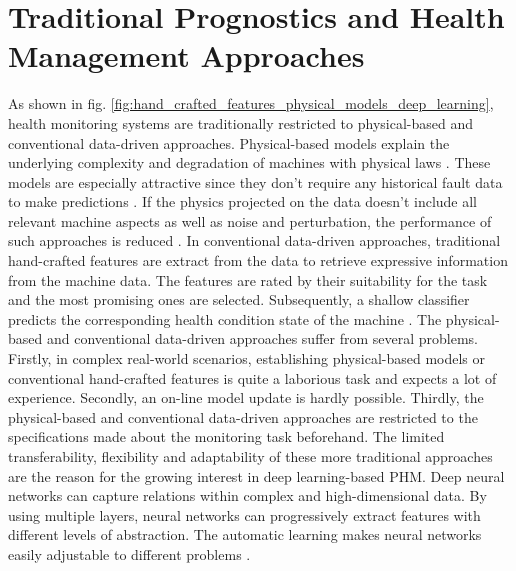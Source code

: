 \section{Traditional Prognostics and Health Management Approaches}
As shown in fig. \ref{fig:hand_crafted_features_physical_models_deep_learning}, health monitoring systems are traditionally restricted to physical-based and conventional data-driven approaches. Physical-based models explain the underlying complexity and degradation of machines with physical laws \cite{ZHAO2019213}. These models are especially attractive since they don't require any historical fault data to make predictions \cite{AN201942}. If the physics projected on the data doesn't include all relevant machine aspects as well as noise and perturbation, the performance of such approaches is reduced \cite{ZHAO2019213}. In conventional data-driven approaches, traditional hand-crafted features are extract from the data to retrieve expressive information from the machine data. The features are rated by their suitability for the task and the most promising ones are selected. Subsequently, a shallow classifier predicts the corresponding health condition state of the machine \cite{ZHAO2019213}. The physical-based and conventional data-driven approaches suffer from several problems. Firstly, in complex real-world scenarios, establishing physical-based models or conventional hand-crafted features is quite a laborious task and expects a lot of experience. Secondly, an on-line model update is hardly possible. Thirdly, the physical-based and conventional data-driven approaches are restricted to the specifications made about the monitoring task beforehand. The limited transferability, flexibility and adaptability of these more traditional approaches are the reason for the growing interest in deep learning-based PHM. Deep neural networks can capture relations within complex and high-dimensional data. By using multiple layers, neural networks can progressively extract features with different levels of abstraction. The automatic learning makes neural networks easily adjustable to different problems \cite{ZHAO2019213}.

